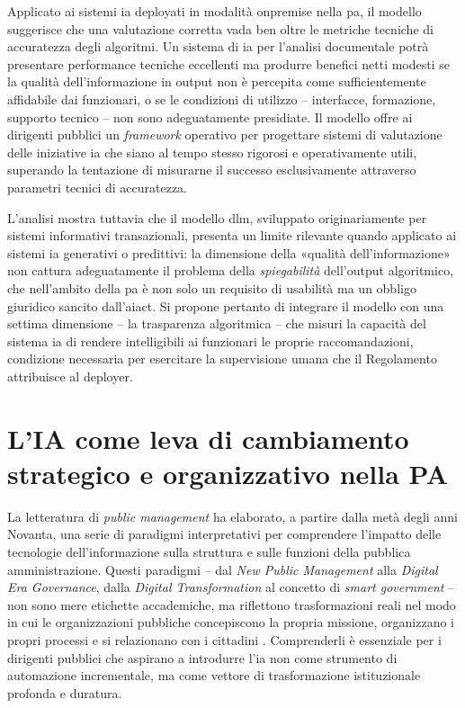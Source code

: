 Applicato ai sistemi \gls{ia} deployati in modalità \gls{onpremise} nella \gls{pa}, il modello suggerisce che una valutazione corretta vada ben oltre le metriche tecniche di accuratezza degli algoritmi. Un sistema di \gls{ia} per l'analisi documentale potrà presentare performance tecniche eccellenti ma produrre benefici netti modesti se la qualità dell'informazione in output non è percepita come sufficientemente affidabile dai funzionari, o se le condizioni di utilizzo -- interfacce, formazione, supporto tecnico -- non sono adeguatamente presidiate. Il modello offre ai dirigenti pubblici un \textit{framework} operativo per progettare sistemi di valutazione delle iniziative \gls{ia} che siano al tempo stesso rigorosi e operativamente utili, superando la tentazione di misurarne il successo esclusivamente attraverso parametri tecnici di accuratezza.

L'analisi mostra tuttavia che il modello \gls{dlm}, sviluppato originariamente per sistemi informativi transazionali, presenta un limite rilevante quando applicato ai sistemi \gls{ia} generativi o predittivi: la dimensione della «qualità dell'informazione» non cattura adeguatamente il problema della \textit{spiegabilità} dell'output algoritmico, che nell'ambito della \gls{pa} è non solo un requisito di usabilità ma un obbligo giuridico sancito dall'\gls{aiact}. Si propone pertanto di integrare il modello con una settima dimensione -- la trasparenza algoritmica -- che misuri la capacità del sistema \gls{ia} di rendere intelligibili ai funzionari le proprie raccomandazioni, condizione necessaria per esercitare la supervisione umana che il Regolamento attribuisce al deployer.

\section{L'IA come leva di cambiamento strategico e organizzativo nella PA}
\label{sec:cap2-ia-strategica}

La letteratura di \textit{public management} ha elaborato, a partire dalla metà degli anni Novanta, una serie di paradigmi interpretativi per comprendere l'impatto delle tecnologie dell'informazione sulla struttura e sulle funzioni della pubblica amministrazione. Questi paradigmi -- dal \textit{New Public Management} alla \textit{Digital Era Governance}, dalla \textit{Digital Transformation} al concetto di \textit{smart government} -- non sono mere etichette accademiche, ma riflettono trasformazioni reali nel modo in cui le organizzazioni pubbliche concepiscono la propria missione, organizzano i propri processi e si relazionano con i cittadini \parencite{Dunleavy2006}. Comprenderli è essenziale per i dirigenti pubblici che aspirano a introdurre l'\gls{ia} non come strumento di automazione incrementale, ma come vettore di trasformazione istituzionale profonda e duratura.

